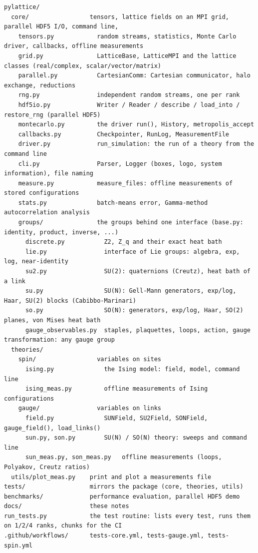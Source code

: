 \documentclass[11pt]{article}
\begin{document}
\begin{lstlisting}[basicstyle=\ttfamily\footnotesize]
pylattice/
  core/                 tensors, lattice fields on an MPI grid, parallel HDF5 I/O, command line,
    tensors.py            random streams, statistics, Monte Carlo driver, callbacks, offline measurements
    grid.py               LatticeBase, LatticeMPI and the lattice classes (real/complex, scalar/vector/matrix)
    parallel.py           CartesianComm: Cartesian communicator, halo exchange, reductions
    rng.py                independent random streams, one per rank
    hdf5io.py             Writer / Reader / describe / load_into / restore_rng (parallel HDF5)
    montecarlo.py         the driver run(), History, metropolis_accept
    callbacks.py          Checkpointer, RunLog, MeasurementFile
    driver.py             run_simulation: the run of a theory from the command line
    cli.py                Parser, Logger (boxes, logo, system information), file naming
    measure.py            measure_files: offline measurements of stored configurations
    stats.py              batch-means error, Gamma-method autocorrelation analysis
    groups/               the groups behind one interface (base.py: identity, product, inverse, ...)
      discrete.py           Z2, Z_q and their exact heat bath
      lie.py                interface of Lie groups: algebra, exp, log, near-identity
      su2.py                SU(2): quaternions (Creutz), heat bath of a link
      su.py                 SU(N): Gell-Mann generators, exp/log, Haar, SU(2) blocks (Cabibbo-Marinari)
      so.py                 SO(N): generators, exp/log, Haar, SO(2) planes, von Mises heat bath
      gauge_observables.py  staples, plaquettes, loops, action, gauge transformation: any gauge group
  theories/
    spin/                 variables on sites
      ising.py              the Ising model: field, model, command line
      ising_meas.py         offline measurements of Ising configurations
    gauge/                variables on links
      field.py              SUNField, SU2Field, SONField, gauge_field(), load_links()
      sun.py, son.py        SU(N) / SO(N) theory: sweeps and command line
      sun_meas.py, son_meas.py   offline measurements (loops, Polyakov, Creutz ratios)
  utils/plot_meas.py    print and plot a measurements file
tests/                  mirrors the package (core, theories, utils)
benchmarks/             performance evaluation, parallel HDF5 demo
docs/                   these notes
run_tests.py            the test routine: lists every test, runs them on 1/2/4 ranks, chunks for the CI
.github/workflows/      tests-core.yml, tests-gauge.yml, tests-spin.yml
\end{lstlisting}
\end{document}
